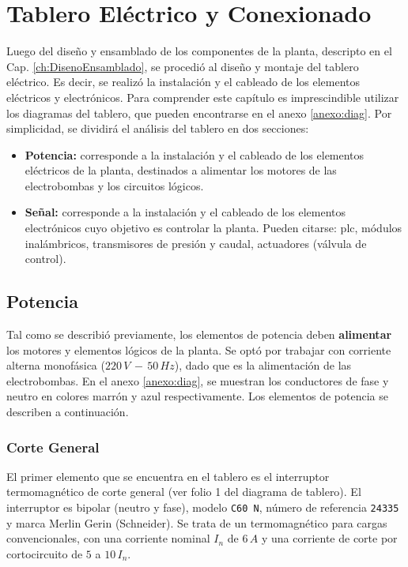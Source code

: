 \chapter{Tablero Eléctrico y Conexionado}
\label{ch:tablero}

Luego del diseño y ensamblado de los componentes de la planta, descripto en el
Cap.
\ref{ch:DisenoEnsamblado}, se procedió al diseño y montaje del
tablero eléctrico.
Es decir, se realizó la instalación y el cableado de los elementos eléctricos y
electrónicos.
Para comprender este capítulo es imprescindible utilizar los diagramas
del tablero, que pueden encontrarse en el anexo \ref{anexo:diag}.
Por simplicidad, se dividirá el análisis del tablero en dos secciones:
\begin{itemize}
 \item \textbf{Potencia:} corresponde a la instalación y el cableado
 de los elementos eléctricos de la planta, destinados a alimentar los motores de
 las electrobombas y los circuitos lógicos.
 \item \textbf{Señal:} corresponde a la instalación y el cableado
 de los elementos electrónicos cuyo objetivo es controlar la planta.
 Pueden citarse: \gls{plc}, módulos inalámbricos,
 transmisores de presión y caudal, actuadores (válvula de control).
\end{itemize}

\section{Potencia}
\label{sec:Potencia}
Tal como se describió previamente, los elementos de potencia deben
\textbf{alimentar} los motores y elementos lógicos de la planta.
Se optó por trabajar con corriente alterna monofásica ($220\,V\,-\,50\,Hz$),
dado que es la alimentación de las electrobombas.
En el anexo \ref{anexo:diag}, se muestran los conductores de fase y neutro en
colores marrón y azul respectivamente.
Los elementos de potencia se describen a continuación.

\subsection{Corte General}
\label{subsec:corteGeneral}
El primer elemento que se encuentra en el tablero es el interruptor
termomagnético de corte general (ver folio 1 del diagrama de tablero).
El interruptor es bipolar (neutro y fase), modelo \verb|C60 N|, número de
referencia \verb|24335| y marca Merlin Gerin (Schneider).
Se trata de un termomagnético para cargas convencionales, con una corriente
nominal $I_n$ de $6\,A$ y una corriente de corte por cortocircuito de $5$ a
$10\,I_n$.

